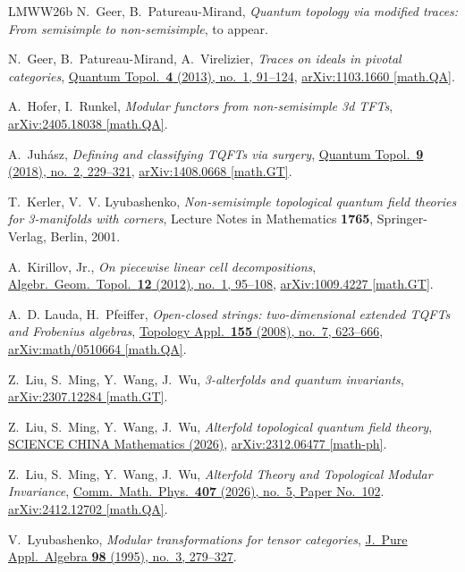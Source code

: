 \documentclass[11pt]{amsart}
\theoremstyle{definition}
\numberwithin{equation}{section}
\newcommand\arxiv[2]      {\href{http://arXiv.org/abs/#1}{arXiv:#2}}
\newcommand\doi[2]        {\href{http://dx.doi.org/#1}{#2}}
\newcommand{\etalchar}[1] {$^{#1}$}
\begin{document}
\begin{thebibliography}{LMWW26b}
N.~Geer, B.~Patureau-Mirand,
\textsl{Quantum topology via modified traces:
From semisimple to non-semisimple}, to appear.

N.~Geer, B.~Patureau-Mirand, A.~Virelizier,
\textsl{Traces on ideals in pivotal categories},
\doi{10.4171/QT/36}{Quantum Topol.\ \textbf{4} (2013), no.~1, 91--124},
\arxiv{1103.1660}{1103.1660 [math.QA]}.

A.~Hofer, I.~Runkel,
\textsl{Modular functors from non-semisimple 3d TFTs},
\arxiv{2405.18038}{2405.18038 [math.QA]}.

A.~Juh\'asz,
\textsl{Defining and classifying TQFTs via surgery},
\doi{10.4171/QT/108}{Quantum Topol.\ \textbf{9} (2018), no.~2, 229--321},
\arxiv{1408.0668}{1408.0668 [math.GT]}.

T.~Kerler, V.~V. Lyubashenko,
\textsl{Non-semisimple topological quantum field theories for 3-manifolds with corners},
Lecture Notes in Mathematics \textbf{1765}, Springer-Verlag, Berlin, 2001.

A.~Kirillov, Jr.,
\textsl{On piecewise linear cell decompositions},
\doi{10.2140/agt.2012.12.95}{Algebr.\ Geom.\ Topol.\ \textbf{12} (2012), no.~1, 95--108},
\arxiv{1009.4227}{1009.4227 [math.GT]}.

A.~D. Lauda, H.~Pfeiffer,
\textsl{Open-closed strings: two-dimensional extended TQFTs and Frobenius algebras},
\doi{10.1016/j.topol.2007.11.005}{Topology Appl.\ \textbf{155} (2008), no.~7, 623--666},
\arxiv{math/0510664}{math/0510664 [math.QA]}.

\bibitem[LMW{\etalchar{+}}23a]{atfd1}
Z.~Liu, S.~Ming, Y.~Wang, J.~Wu,
\textsl{3-alterfolds and quantum invariants},
\arxiv{2307.12284}{2307.12284 [math.GT]}.

\bibitem[LMW{\etalchar{+}}23b]{atfd2}
Z.~Liu, S.~Ming, Y.~Wang, J.~Wu,
\textsl{Alterfold topological quantum field theory},
\doi{10.1007/s11425-026-05590-9}{SCIENCE CHINA Mathematics (2026)},
\arxiv{2312.06477}{2312.06477 [math-ph]}.

\bibitem[LMW{\etalchar{+}}24a]{atfd3}
Z.~Liu, S.~Ming, Y.~Wang, J.~Wu,
\textsl{Alterfold Theory and Topological Modular Invariance},
\doi{10.1007/s00220-026-05590-9}{Comm.\ Math.\ Phys.\ \textbf{407} (2026), no.~5, Paper No.~102}.
\arxiv{2412.12702}{2412.12702 [math.QA]}.

V.~Lyubashenko,
\textsl{Modular transformations for tensor categories},
\doi{10.1016/0022-4049(94)00045-K}{J.\ Pure Appl.\ Algebra \textbf{98} (1995), no.~3, 279--327}.


\end{thebibliography}
\end{document}
